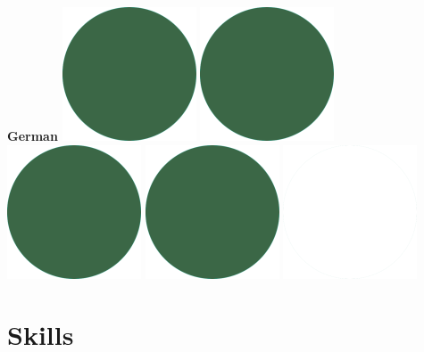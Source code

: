 \documentclass[]{commands}
\begin{document}
\begin{aside}
\textbf{German}\hfill
\includegraphics[scale=0.11]{img/IPSGreenDots.png}
\includegraphics[scale=0.11]{img/IPSGreenDots.png}
\includegraphics[scale=0.11]{img/IPSGreenDots.png}
\includegraphics[scale=0.11]{img/IPSGreenDots.png}
\includegraphics[scale=0.11]{img/WhiteDots.png}

\vspace{3.5mm}
\section{Skills}
\vspace{3.5mm}


\end{aside}
\end{document}
